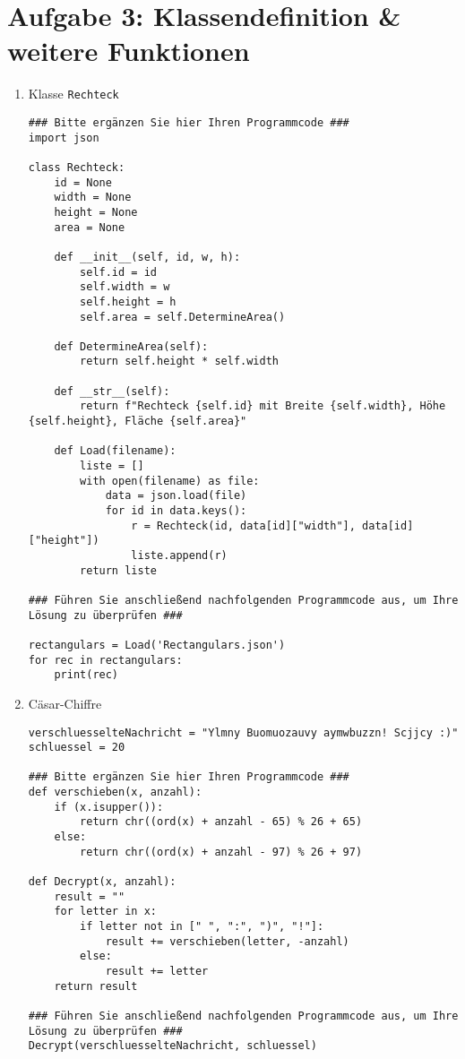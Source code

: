 \documentclass{article}
\begin{document}
	\section*{Aufgabe 3: Klassendefinition \& weitere Funktionen}
	\begin{enumerate}[label=(\alph*)]
		\item Klasse \texttt{Rechteck}
		\begin{lstlisting}
### Bitte ergänzen Sie hier Ihren Programmcode ###
import json

class Rechteck:
	id = None
	width = None
	height = None
	area = None

	def __init__(self, id, w, h):
		self.id = id
		self.width = w
		self.height = h
		self.area = self.DetermineArea()

	def DetermineArea(self):
		return self.height * self.width

	def __str__(self):
		return f"Rechteck {self.id} mit Breite {self.width}, Höhe {self.height}, Fläche {self.area}"

	def Load(filename):
		liste = []
		with open(filename) as file:
			data = json.load(file)
			for id in data.keys():
				r = Rechteck(id, data[id]["width"], data[id]["height"])
				liste.append(r)
		return liste

### Führen Sie anschließend nachfolgenden Programmcode aus, um Ihre Lösung zu überprüfen ###

rectangulars = Load('Rectangulars.json')
for rec in rectangulars:
	print(rec)

		\end{lstlisting}
		\item Cäsar-Chiffre
		\begin{lstlisting}
verschluesselteNachricht = "Ylmny Buomuozauvy aymwbuzzn! Scjjcy :)"
schluessel = 20

### Bitte ergänzen Sie hier Ihren Programmcode ###
def verschieben(x, anzahl):
	if (x.isupper()):
		return chr((ord(x) + anzahl - 65) % 26 + 65)
	else:
		return chr((ord(x) + anzahl - 97) % 26 + 97)

def Decrypt(x, anzahl):
	result = ""
	for letter in x:
		if letter not in [" ", ":", ")", "!"]:
			result += verschieben(letter, -anzahl)
		else:
			result += letter
	return result

### Führen Sie anschließend nachfolgenden Programmcode aus, um Ihre Lösung zu überprüfen ###
Decrypt(verschluesselteNachricht, schluessel)
		\end{lstlisting}
	\end{enumerate}
\end{document}
